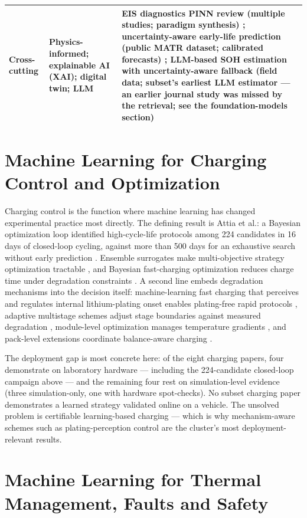 \documentclass[journal]{IEEEtran}
\begin{document}
\begin{table}[!t]
\begin{tabular}{|p{0.87in}|p{2.75in}|p{3.02in}|}
Cross-cutting & Physics-informed; explainable AI (XAI); digital twin; LLM & EIS diagnostics PINN review (multiple studies; paradigm synthesis) \cite{r21}; uncertainty-aware early-life prediction (public MATR dataset; calibrated forecasts) \cite{r77}; LLM-based SOH estimation with uncertainty-aware fallback (field data; subset's earliest LLM estimator --- an earlier journal study was missed by the retrieval; see the foundation-models section) \cite{r15} \\
\hline
\end{tabular}
\end{table}

\section{Machine Learning for Charging Control and Optimization}

Charging control is the function where machine learning has changed experimental practice most directly. The defining result is Attia et al.: a Bayesian optimization loop identified high-cycle-life protocols among 224 candidates in 16 days of closed-loop cycling, against more than 500 days for an exhaustive search without early prediction \cite{r4}. Ensemble surrogates make multi-objective strategy optimization tractable \cite{r71}, and Bayesian fast-charging optimization reduces charge time under degradation constraints \cite{r78}. A second line embeds degradation mechanisms into the decision itself: machine-learning fast charging that perceives and regulates internal lithium-plating onset enables plating-free rapid protocols \cite{r70}, adaptive multistage schemes adjust stage boundaries against measured degradation \cite{r79}, module-level optimization manages temperature gradients \cite{r80}, and pack-level extensions coordinate balance-aware charging \cite{r81}\cite{r82}.

The deployment gap is most concrete here: of the eight charging papers, four demonstrate on laboratory hardware --- including the 224-candidate closed-loop campaign above --- and the remaining four rest on simulation-level evidence (three simulation-only, one with hardware spot-checks). No subset charging paper demonstrates a learned strategy validated online on a vehicle. The unsolved problem is certifiable learning-based charging --- which is why mechanism-aware schemes such as plating-perception control \cite{r70} are the cluster's most deployment-relevant results.

\section{Machine Learning for Thermal Management, Faults and Safety}
\end{document}

